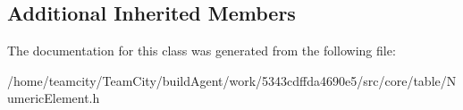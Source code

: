 \subsection*{Additional Inherited Members}


The documentation for this class was generated from the following file\+:\begin{DoxyCompactItemize}
\item 
/home/teamcity/\+Team\+City/build\+Agent/work/5343cdffda4690e5/src/core/table/Numeric\+Element.\+h\end{DoxyCompactItemize}
